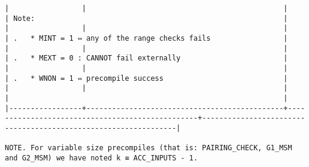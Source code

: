 \documentclass[varwidth=\maxdimen,margin=0.5cm,multi={verbatim}]{standalone}
\begin{document}
\begin{verbatim}
|                 |                                              |                                                 | Note:                                                          |
|                 |                                              |                                                 | .   * MINT = 1 ⇔ any of the range checks fails                 |
|                 |                                              |                                                 | .   * MEXT = 0 : CANNOT fail externally                        |
|                 |                                              |                                                 | .   * WNON = 1 ⇔ precompile success                            |
|                 |                                              |                                                 |                                                                |
|-----------------+----------------------------------------------+-------------------------------------------------+----------------------------------------------------------------|

NOTE. For variable size precompiles (that is: PAIRING_CHECK, G1_MSM and G2_MSM) we have noted k ≡ ACC_INPUTS - 1.
\end{verbatim}
\end{document}
